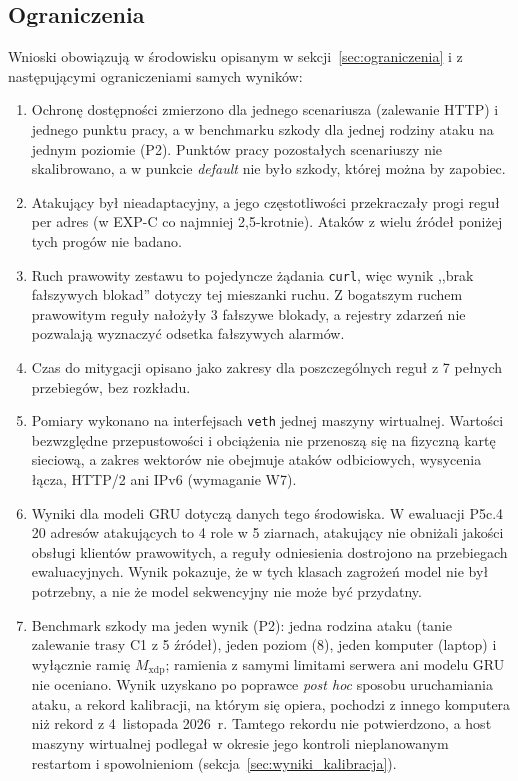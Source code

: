\documentclass[a4paper,12pt]{article}
\begin{document}
\subsection{Ograniczenia}\label{sec:wnioski_ograniczenia}
Wnioski obowiązują w środowisku opisanym w sekcji~\ref{sec:ograniczenia} i z następującymi ograniczeniami samych wyników:
\begin{enumerate}
    \item Ochronę dostępności zmierzono dla jednego scenariusza (zalewanie HTTP) i jednego punktu pracy, a w benchmarku szkody dla jednej rodziny ataku na jednym poziomie (P2). Punktów pracy pozostałych scenariuszy nie skalibrowano, a w punkcie \textit{default} nie było szkody, której można by zapobiec.
    \item Atakujący był nieadaptacyjny, a jego częstotliwości przekraczały progi reguł per adres (w EXP-C co najmniej 2,5-krotnie). Ataków z wielu źródeł poniżej tych progów nie badano.
    \item Ruch prawowity zestawu to pojedyncze żądania \texttt{curl}, więc wynik ,,brak fałszywych blokad'' dotyczy tej mieszanki ruchu. Z bogatszym ruchem prawowitym reguły nałożyły 3 fałszywe blokady, a rejestry zdarzeń nie pozwalają wyznaczyć odsetka fałszywych alarmów.
    \item Czas do mitygacji opisano jako zakresy dla poszczególnych reguł z 7 pełnych przebiegów, bez rozkładu.
    \item Pomiary wykonano na interfejsach \texttt{veth} jednej maszyny wirtualnej. Wartości bezwzględne przepustowości i obciążenia nie przenoszą się na fizyczną kartę sieciową, a zakres wektorów nie obejmuje ataków odbiciowych, wysycenia łącza, HTTP/2 ani IPv6 (wymaganie W7).
    \item Wyniki dla modeli GRU dotyczą danych tego środowiska. W ewaluacji P5c.4 20 adresów atakujących to 4 role w 5 ziarnach, atakujący nie obniżali jakości obsługi klientów prawowitych, a reguły odniesienia dostrojono na przebiegach ewaluacyjnych. Wynik pokazuje, że w tych klasach zagrożeń model nie był potrzebny, a nie że model sekwencyjny nie może być przydatny.
    \item Benchmark szkody ma jeden wynik (P2): jedna rodzina ataku (tanie zalewanie trasy C1 z 5 źródeł), jeden poziom (8), jeden komputer (laptop) i wyłącznie ramię $M_{\mathrm{xdp}}$; ramienia z samymi limitami serwera ani modelu GRU nie oceniano. Wynik uzyskano po poprawce \textit{post hoc} sposobu uruchamiania ataku, a rekord kalibracji, na którym się opiera, pochodzi z innego komputera niż rekord z 4~listopada 2026~r. Tamtego rekordu nie potwierdzono, a host maszyny wirtualnej podlegał w okresie jego kontroli nieplanowanym restartom i spowolnieniom (sekcja~\ref{sec:wyniki_kalibracja}).
\end{enumerate}
\end{document}
